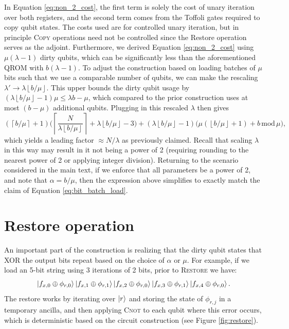 \documentclass[a4paper, amsfonts, amssymb, amsmath, reprint, showkeys, twoside,superscriptaddress, onecolumn, nofootinbib]{revtex4-2}
\newcommand{\ceil}[1]{\left\lceil #1 \right\rceil}
\newcommand{\floor}[1]{\left\lfloor #1 \right\rfloor}
\begin{document}
In Equation \ref{eq:non_2_cost}, the first term is solely the cost of unary iteration over both registers, and the second term comes from the Toffoli gates required to copy qubit states. The costs used are for controlled unary iteration, but in principle \textsc{Copy} operations need not be controlled since the Restore operation serves as the adjoint. Furthermore, we derived Equation \ref{eq:non_2_cost} using $\mu(\lambda-1)$ dirty qubits, which can be significantly less than the aforementioned QROM with $b(\lambda -1)$. To adjust the construction based on loading batches of $\mu$ bits such that we use a comparable number of qubits, we can make the rescaling $\lambda' \to \lambda \floor{b/\mu}$. This upper bounds the dirty qubit usage by $(\lambda \floor{b/\mu}-1)\mu \leq \lambda b - \mu$, which compared to the prior construction uses at most $(b-\mu)$ additional qubits. Plugging in this rescaled $\lambda$ then gives
\begin{equation}
    (\ceil{b/\mu}+1)\biggr(\ceil{\frac{N}{\lambda\floor{b/\mu}}}+\lambda\floor{b/\mu} -3 \biggr) + (\lambda\floor{b/\mu}-1)\Bigr( \mu (\floor{b/\mu}+1) + b \, \mathrm{mod}\, \mu \Bigr), 
\end{equation}
which yields a leading factor $\approx N/\lambda$ as previously claimed. Recall that scaling $\lambda$ in this way may result in it not being a power of 2 (requiring rounding to the nearest power of 2 or applying integer division). Returning to the scenario considered in the main text, if we enforce that all parameters be a power of 2, and note that $\alpha = b/\mu$, then the expression above simplifies to exactly match the claim of Equation \ref{eq:bit_batch_load}. 

\section{Restore operation} \label{sec:restore}
An important part of the construction is realizing that the dirty qubit states that XOR the output bits repeat based on the choice of $\alpha$ or $\mu$. For example, if we load an 5-bit string using 3 iterations of 2 bits, prior to \textsc{Restore} we have:
\begin{equation}
    \ket{f_{x,0} \oplus \phi_{r, 0} }\ket{f_{x,1} \oplus \phi_{r, 1} }\ket{f_{x,2} \oplus \phi_{r, 0} }\ket{f_{x,3} \oplus \phi_{r, 1} }\ket{f_{x,4} \oplus \phi_{r, 0} }.
\end{equation}
The restore works by iterating over $\ket r$ and storing the state of $\phi_{r, j}$ in a temporary ancilla, and then applying \textsc{Cnot} to each qubit where this error occurs, which is deterministic based on the circuit construction (see Figure \ref{fig:restore}).
\end{document}
